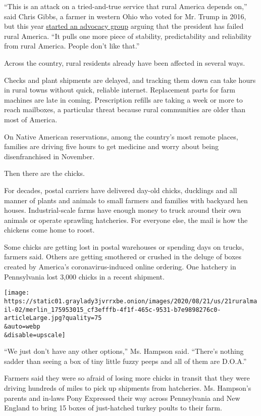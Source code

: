 ``This is an attack on a tried-and-true service that rural America
depends on,'' said Chris Gibbs, a farmer in western Ohio who voted for
Mr. Trump in 2016, but this year
\href{https://ruralamerica2020.org/about-us/}{started an advocacy group}
arguing that the president has failed rural America. ``It pulls one more
piece of stability, predictability and reliability from rural America.
People don't like that.''

Across the country, rural residents already have been affected in
several ways.

Checks and plant shipments are delayed, and tracking them down can take
hours in rural towns without quick, reliable internet. Replacement parts
for farm machines are late in coming. Prescription refills are taking a
week or more to reach mailboxes, a particular threat because rural
communities are older than most of America.

On Native American reservations, among the country's most remote places,
families are driving five hours to get medicine and worry about being
disenfranchised in November.

Then there are the chicks.

For decades, postal carriers have delivered day-old chicks, ducklings
and all manner of plants and animals to small farmers and families with
backyard hen houses. Industrial-scale farms have enough money to truck
around their own animals or operate sprawling hatcheries. For everyone
else, the mail is how the chickens come home to roost.

Some chicks are getting lost in postal warehouses or spending days on
trucks, farmers said. Others are getting smothered or crushed in the
deluge of boxes created by America's coronavirus-induced online
ordering. One hatchery in Pennsylvania lost 3,000 chicks in a recent
shipment.

\texttt{[image: https://static01.graylady3jvrrxbe.onion/images/2020/08/21/us/21ruralmail-02/merlin\_175953015\_cf3efffb-4f1f-465c-9531-b7e9898276c0-articleLarge.jpg?quality=75\\\&auto=webp\\\&disable=upscale]}

``We just don't have any other options,'' Ms. Hampson said. ``There's
nothing sadder than seeing a box of tiny little fuzzy peeps and all of
them are D.O.A.''

Farmers said they were so afraid of losing more chicks in transit that
they were driving hundreds of miles to pick up shipments from
hatcheries. Ms. Hampson's parents and in-laws Pony Expressed their way
across Pennsylvania and New England to bring 15 boxes of just-hatched
turkey poults to their farm.

